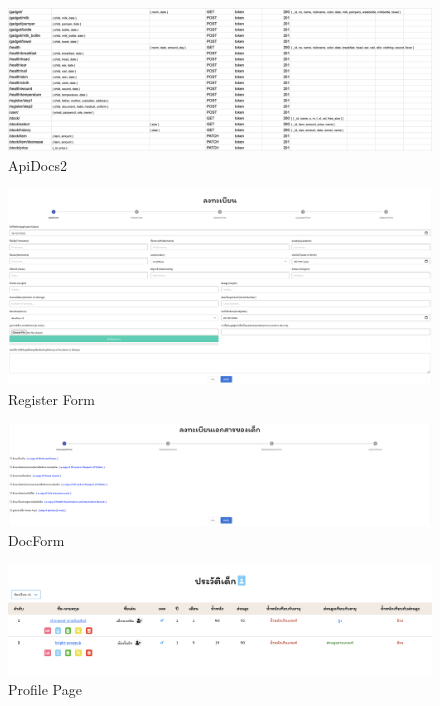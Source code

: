 \begin{figure}
  \begin{center}
    \includegraphics[width=\linewidth]{images/ApiDocTwo.png}
  \end{center}
  \caption[ตารางแสดง API Document 2]{ApiDocs2}
  \label{fig:ApiDocs2}
\end{figure}

\begin{figure}
  \begin{center}
  \includegraphics[width=\linewidth]{images/RegisterForm.png}
  \end{center}
  \caption[หน้าลงทะเบียนเด็ก]{Register Form}
  \label{fig:register}
  \end{figure}

\begin{figure}
  \begin{center}
  \includegraphics[width=\linewidth]{images/DocForm.png}
  \end{center}
  \caption[หน้าลงทะเบียนเอกสาร]{DocForm}
  \label{fig:docForm}
  \end{figure}

\begin{figure}
  \begin{center}
  \includegraphics[width=\linewidth]{images/Profile.png}
  \end{center}
  \caption[หน้าโปรไฟล์]{Profile Page}
  \label{fig:Profile}
  \end{figure}

